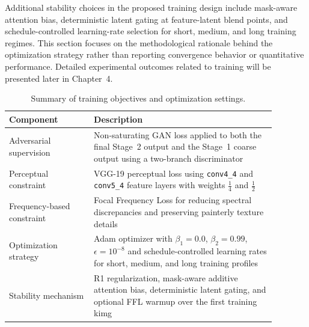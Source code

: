 \documentclass[12pt, twoside]{report}
\begin{document}
Additional stability choices in the proposed training design include mask-aware attention bias, deterministic latent gating at feature-latent blend points, and schedule-controlled learning-rate selection for short, medium, and long training regimes. This section focuses on the methodological rationale behind the optimization strategy rather than reporting convergence behavior or quantitative performance. Detailed experimental outcomes related to training will be presented later in Chapter~4.

\begin{table}[H]
\centering
\caption{Summary of training objectives and optimization settings.}
\label{tab:training_objectives_summary}
\begin{tabular}{p{0.28\linewidth} p{0.6\linewidth}}
\toprule
\textbf{Component} & \textbf{Description} \\
\midrule
Adversarial supervision & Non-saturating GAN loss applied to both the final Stage~2 output and the Stage~1 coarse output using a two-branch discriminator \\
Perceptual constraint & VGG-19 perceptual loss using \texttt{conv4\_4} and \texttt{conv5\_4} feature layers with weights $\tfrac{1}{4}$ and $\tfrac{1}{2}$ \\
Frequency-based constraint & Focal Frequency Loss for reducing spectral discrepancies and preserving painterly texture details \\
Optimization strategy & Adam optimizer with $\beta_1=0.0$, $\beta_2=0.99$, $\epsilon=10^{-8}$ and schedule-controlled learning rates for short, medium, and long training profiles \\
Stability mechanism & R1 regularization, mask-aware additive attention bias, deterministic latent gating, and optional FFL warmup over the first training kimg \\
\bottomrule
\end{tabular}
\end{table}
\end{document}
